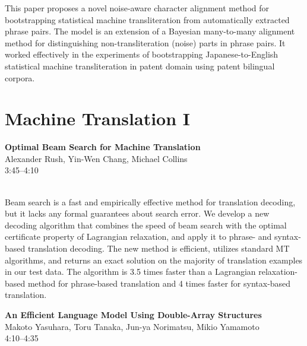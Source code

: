 \documentclass[twoside,makeidx]{book}
\begin{document}
\nopagebreak%
\noindent%
{\small This paper proposes a novel noise-aware character alignment method for bootstrapping statistical machine transliteration from automatically extracted phrase pairs. The model is an extension of a Bayesian many-to-many alignment method for distinguishing non-transliteration (noise) parts in phrase pairs. It worked effectively in the experiments of bootstrapping Japanese-to-English statistical machine transliteration in patent domain using patent bilingual corpora.}
\clearpage
\section{Machine Translation I}
\vspace{-1em}
\par\vspace{2em}\noindent%
\begin{minipage}{\linewidth}%
\begin{center}
\textbf{\normalsize Optimal Beam Search for Machine Translation}\\
\normalsize  Alexander Rush,  Yin-Wen Chang,  Michael Collins\\
{\small 3:45--4:10}\\
\end{center}
\end{minipage}\\[0.5em]
\nopagebreak%
\noindent%
{\small Beam search is a fast and empirically effective method for translation decoding, but it lacks any formal guarantees about search error. We develop a new decoding algorithm that combines the speed of beam search with the optimal certificate property of Lagrangian relaxation, and apply it to phrase- and syntax-based translation decoding. The new method is efficient, utilizes standard MT algorithms, and returns an exact solution on the majority of translation examples in our test data. The algorithm is 3.5 times faster than a Lagrangian relaxation-based method for phrase-based translation and 4 times faster for syntax-based translation.}
\par\vspace{2em}\noindent%
\begin{minipage}{\linewidth}%
\begin{center}
\textbf{\normalsize An Efficient Language Model Using Double-Array Structures}\\
\normalsize  Makoto Yasuhara,  Toru Tanaka,  Jun-ya Norimatsu,  Mikio Yamamoto\\
{\small 4:10--4:35}\\
\end{center}
\end{minipage}\\[0.5em]
\end{document}
